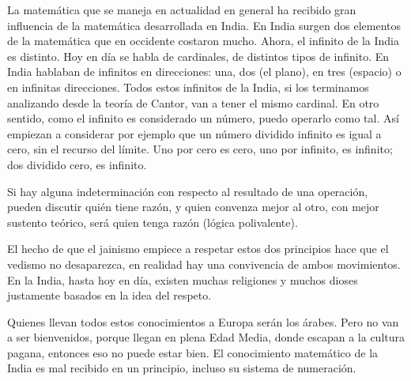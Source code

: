 La matemática que se maneja en actualidad en general ha recibido gran influencia de la matemática desarrollada en India. En India surgen dos elementos de la matemática que en occidente costaron mucho. Ahora, el infinito de la India es distinto. Hoy en día se habla de cardinales, de distintos tipos de infinito. En India hablaban de infinitos en direcciones: una, dos (el plano), en tres (espacio) o en infinitas direcciones. Todos estos infinitos de la India, si los terminamos analizando desde la teoría de Cantor, van a tener el mismo cardinal. En otro sentido, como el infinito es considerado un número, puedo operarlo como tal. Así empiezan a considerar por ejemplo que un número dividido infinito es igual a cero, sin el recurso del límite. Uno por cero es cero, uno por infinito, es infinito; dos dividido cero, es infinito. 

Si hay alguna indeterminación con respecto al resultado de una operación, pueden discutir quién tiene razón, y quien convenza mejor al otro, con mejor sustento teórico, será quien tenga razón (lógica polivalente).

El hecho de que el jainismo empiece a respetar estos dos principios hace que el vedismo no desaparezca, en realidad hay una convivencia de ambos movimientos. En la India, hasta hoy en día, existen muchas religiones y muchos dioses justamente basados en la idea del respeto.

Quienes llevan todos estos conocimientos a Europa serán los árabes. Pero no van a ser bienvenidos, porque llegan en plena Edad Media, donde escapan a la cultura pagana, entonces eso no puede estar bien. El conocimiento matemático de la India es mal recibido en un principio, incluso su sistema de numeración.
